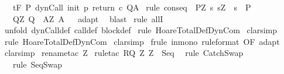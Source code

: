 \begin{isabellebody}
\ \ \ {\isachardoublequoteopen}{\isasymGamma}{\isacharcomma}{\isasymTheta}{\isasymturnstile}\isactrlsub t\isactrlbsub {\isacharslash}F\isactrlesub \ P\ dynCall\ init\ p\ return\ c\ Q{\isacharcomma}A{\isachardoublequoteclose}\isanewline
%
\isadelimproof
%
\endisadelimproof
%
\isatagproof
{}\isamarkupfalse%
\ {\isacharparenleft}rule\ conseq\ {\isacharbrackleft}\ P{\isacharprime}{\isacharequal}{\isachardoublequoteopen}{\isasymlambda}Z{\isachardot}\ {\isacharbraceleft}s{\isachardot}\ s{\isacharequal}Z\ {\isasymand}\ s\ {\isasymin}\ P{\isacharbraceright}{\isachardoublequoteclose}\isanewline
\ \ \ Q{\isacharprime}{\isacharequal}{\isachardoublequoteopen}{\isasymlambda}Z{\isachardot}\ Q{\isachardoublequoteclose}\ \ A{\isacharprime}{\isacharequal}{\isachardoublequoteopen}{\isasymlambda}Z{\isachardot}\ A{\isachardoublequoteclose}{\isacharbrackright}{\isacharparenright}\isanewline
{}\isamarkupfalse%
\ {}\isanewline
{}\isamarkupfalse%
\ adapt\isanewline
{}\isamarkupfalse%
\ \ blast\isanewline
{}\isamarkupfalse%
\ {\isacharparenleft}rule\ allI{\isacharparenright}\isanewline
{}\isamarkupfalse%
\ {\isacharparenleft}unfold\ dynCall{\isacharunderscore}def\ call{\isacharunderscore}def\ block{\isacharunderscore}def{\isacharparenright}\isanewline
{}\isamarkupfalse%
\ {\isacharparenleft}rule\ HoareTotalDef{\isachardot}DynCom{\isacharparenright}\isanewline
{}\isamarkupfalse%
\ clarsimp\isanewline
{}\isamarkupfalse%
\ {\isacharparenleft}rule\ HoareTotalDef{\isachardot}DynCom{\isacharparenright}\isanewline
{}\isamarkupfalse%
\ clarsimp\isanewline
{}\isamarkupfalse%
\ {\isacharparenleft}frule\ in{\isacharunderscore}mono\ {\isacharbrackleft}rule{\isacharunderscore}format{\isacharcomma}\ OF\ adapt{\isacharbrackright}{\isacharparenright}\isanewline
{}\isamarkupfalse%
\ clarsimp\isanewline
{}\isamarkupfalse%
\ {\isacharparenleft}rename{\isacharunderscore}tac\ Z{\isacharprime}{\isacharparenright}\isanewline
{}\isamarkupfalse%
\ {\isacharparenleft}rule{\isacharunderscore}tac\ R{\isacharequal}{\isachardoublequoteopen}Q{\isacharprime}\ Z\ Z{\isacharprime}{\isachardoublequoteclose}\ \ Seq{\isacharparenright}\isanewline
{}\isamarkupfalse%
\ \ {\isacharparenleft}rule\ CatchSwap{\isacharparenright}\isanewline
{}\isamarkupfalse%
\ \ \ {\isacharparenleft}rule\ SeqSwap{\isacharparenright}\isanewline

\end{isabellebody}
